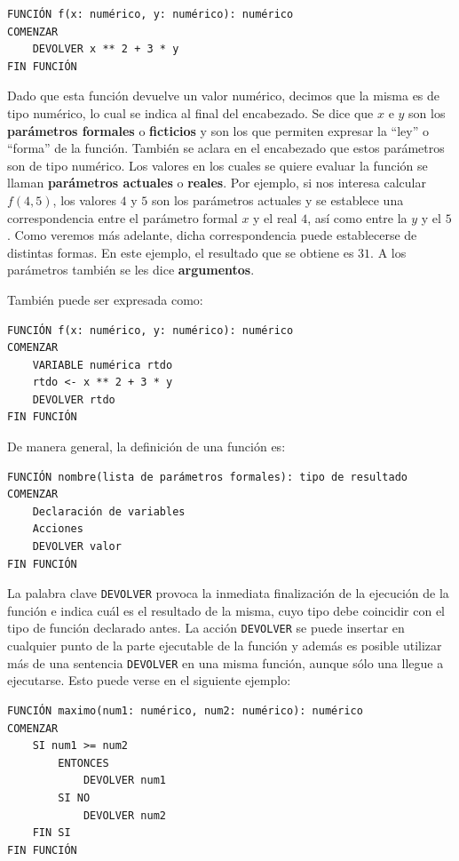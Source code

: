 \documentclass[]{book}
\begin{document}
\begin{verbatim}
FUNCIÓN f(x: numérico, y: numérico): numérico
COMENZAR
    DEVOLVER x ** 2 + 3 * y
FIN FUNCIÓN
\end{verbatim}

Dado que esta función devuelve un valor numérico, decimos que la misma
es de tipo numérico, lo cual se indica al final del encabezado. Se dice
que \(x\) e \(y\) son los \textbf{parámetros formales} o
\textbf{ficticios} y son los que permiten expresar la ``ley'' o
``forma'' de la función. También se aclara en el encabezado que estos
parámetros son de tipo numérico. Los valores en los cuales se quiere
evaluar la función se llaman \textbf{parámetros actuales} o
\textbf{reales}. Por ejemplo, si nos interesa calcular \(f(4, 5)\), los
valores \(4\) y \(5\) son los parámetros actuales y se establece una
correspondencia entre el parámetro formal \(x\) y el real \(4\), así
como entre la \(y\) y el \(5\). Como veremos más adelante, dicha
correspondencia puede establecerse de distintas formas. En este ejemplo,
el resultado que se obtiene es \(31\). A los parámetros también se les
dice \textbf{argumentos}.

También puede ser expresada como:

\begin{verbatim}
FUNCIÓN f(x: numérico, y: numérico): numérico
COMENZAR
    VARIABLE numérica rtdo
    rtdo <- x ** 2 + 3 * y
    DEVOLVER rtdo
FIN FUNCIÓN
\end{verbatim}

De manera general, la definición de una función es:

\begin{verbatim}
FUNCIÓN nombre(lista de parámetros formales): tipo de resultado
COMENZAR
    Declaración de variables
    Acciones
    DEVOLVER valor
FIN FUNCIÓN
\end{verbatim}

La palabra clave \texttt{DEVOLVER} provoca la inmediata finalización de
la ejecución de la función e indica cuál es el resultado de la misma,
cuyo tipo debe coincidir con el tipo de función declarado antes. La
acción \texttt{DEVOLVER} se puede insertar en cualquier punto de la
parte ejecutable de la función y además es posible utilizar más de una
sentencia \texttt{DEVOLVER} en una misma función, aunque sólo una llegue
a ejecutarse. Esto puede verse en el siguiente ejemplo:

\begin{verbatim}
FUNCIÓN maximo(num1: numérico, num2: numérico): numérico
COMENZAR
    SI num1 >= num2
        ENTONCES
            DEVOLVER num1
        SI NO
            DEVOLVER num2
    FIN SI
FIN FUNCIÓN
\end{verbatim}
\end{document}
